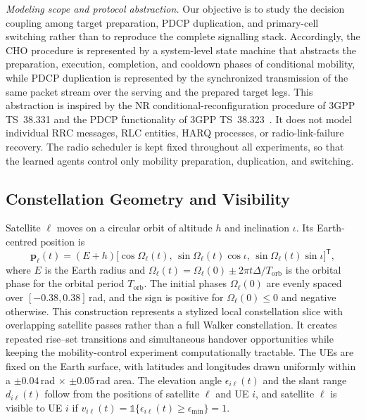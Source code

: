 \documentclass[journal]{IEEEtran}
\newcommand{\ind}{\mathbb{1}}
\begin{document}
\emph{Modeling scope and protocol abstraction.}
Our objective is to study the decision coupling among target preparation,
PDCP duplication, and primary-cell switching rather than to reproduce the
complete signalling stack. Accordingly, the CHO procedure is represented by
a system-level state machine that abstracts the preparation, execution,
completion, and cooldown phases of conditional mobility, while PDCP
duplication is represented by the synchronized transmission of the same
packet stream over the serving and the prepared target legs. This
abstraction is inspired by the NR conditional-reconfiguration procedure of
3GPP TS~38.331 and the PDCP functionality of
3GPP TS~38.323~\cite{3gpp38331,3gpp38323}. It does not model individual RRC
messages, RLC entities, HARQ processes, or radio-link-failure recovery. The
radio scheduler is kept fixed throughout all experiments, so that the
learned agents control only mobility preparation, duplication, and switching.

\subsection{Constellation Geometry and Visibility}

Satellite $\ell$ moves on a circular orbit of altitude $h$ and inclination
$\iota$. Its Earth-centred position is
\begin{equation}
\mathbf{p}_\ell(t) = (E+h)\big[\cos\Omega_\ell(t),\,\sin\Omega_\ell(t)\cos\iota,\,\sin\Omega_\ell(t)\sin\iota\big]^{\mathsf T},
\label{eq:orbit}
\end{equation}
where $E$ is the Earth radius and
$\Omega_\ell(t)=\Omega_\ell(0)\pm2\pi t\Delta/T_{\mathrm{orb}}$ is the orbital
phase for the orbital period $T_{\mathrm{orb}}$. The initial phases
$\Omega_\ell(0)$ are evenly spaced over $[-0.38,0.38]$\,rad, and the sign is
positive for $\Omega_\ell(0)\le0$ and negative otherwise. This construction
represents a stylized local constellation slice with overlapping satellite
passes rather than a full Walker constellation. It creates repeated rise--set
transitions and simultaneous handover opportunities while keeping the
mobility-control experiment computationally tractable. The UEs are fixed on
the Earth surface, with latitudes and longitudes drawn uniformly within a
$\pm0.04$\,rad $\times$ $\pm0.05$\,rad area. The elevation angle
$\epsilon_{i\ell}(t)$ and the slant range $d_{i\ell}(t)$ follow from the
positions of satellite $\ell$ and UE $i$, and satellite $\ell$ is visible to
UE $i$ if $v_{i\ell}(t)=\ind\{\epsilon_{i\ell}(t)\ge\epsilon_{\min}\}=1$.
\end{document}

